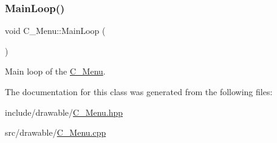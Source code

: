 \subsubsection{\texorpdfstring{Main\+Loop()}{MainLoop()}}
{\footnotesize\ttfamily void C\+\_\+\+Menu\+::\+Main\+Loop (\begin{DoxyParamCaption}{ }\end{DoxyParamCaption})}



Main loop of the \hyperlink{classC__Menu}{C\+\_\+\+Menu}. 



The documentation for this class was generated from the following files\+:\begin{DoxyCompactItemize}
\item 
include/drawable/\hyperlink{C__Menu_8hpp}{C\+\_\+\+Menu.\+hpp}\item 
src/drawable/\hyperlink{C__Menu_8cpp}{C\+\_\+\+Menu.\+cpp}\end{DoxyCompactItemize}
